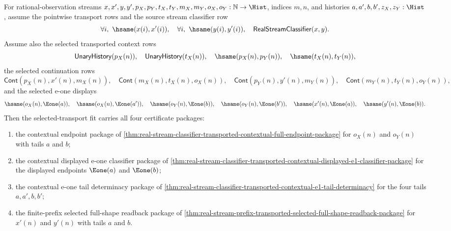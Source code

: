 \begin{theorem}
\label{thm:real-selected-transport-fit-from-stream-classifier}
For rational-observation streams
$x,x',y,y',p_X,p_Y,t_X,t_Y,m_X,m_Y,o_X,o_Y:\mathbb{N}\to\Hist$,
indices $m,n$, and histories $a,a',b,b',z_X,z_Y:\Hist$, assume the pointwise
transport rows and the source stream classifier row
$$
\forall i,\ \hsame(x(i),x'(i)),\quad
\forall i,\ \hsame(y(i),y'(i)),\quad
\mathsf{RealStreamClassifier}(x,y).
$$
Assume also the selected transported context rows
$$
\mathsf{UnaryHistory}(p_X(n)),\quad
\mathsf{UnaryHistory}(t_X(n)),\quad
\hsame(p_X(n),p_Y(n)),\quad
\hsame(t_X(n),t_Y(n)),
$$
the selected continuation rows
$$
\mathsf{Cont}(p_X(n),x'(n),m_X(n)),\quad
\mathsf{Cont}(m_X(n),t_X(n),o_X(n)),
\quad\mathsf{Cont}(p_Y(n),y'(n),m_Y(n)),\quad
\mathsf{Cont}(m_Y(n),t_Y(n),o_Y(n)),
$$
and the selected e-one displays
$$
\hsame(o_X(n),\Eone(a)),\quad
\hsame(o_X(n),\Eone(a')),\quad
\hsame(o_Y(n),\Eone(b)),\quad
\hsame(o_Y(n),\Eone(b')),\quad
\hsame(x'(n),\Eone(a)),\quad
\hsame(y'(n),\Eone(b)).
$$
Then the selected-transport fit carries all four certificate packages:
\begin{enumerate}
\item the contextual endpoint package of
\autoref{thm:real-stream-classifier-transported-contextual-full-endpoint-package}
for $o_X(n)$ and $o_Y(n)$ with tails $a$ and $b$;
\item the contextual displayed e-one classifier package of
\autoref{thm:real-stream-classifier-transported-contextual-displayed-e1-classifier-package}
for the displayed endpoints $\Eone(a)$ and $\Eone(b)$;
\item the contextual e-one tail determinacy package of
\autoref{thm:real-stream-classifier-transported-contextual-e1-tail-determinacy}
for the four tails $a,a',b,b'$;
\item the finite-prefix selected full-shape readback package of
\autoref{thm:real-stream-prefix-transported-selected-full-shape-readback-package}
for $x'(n)$ and $y'(n)$ with tails $a$ and $b$.
\end{enumerate}
\end{theorem}
